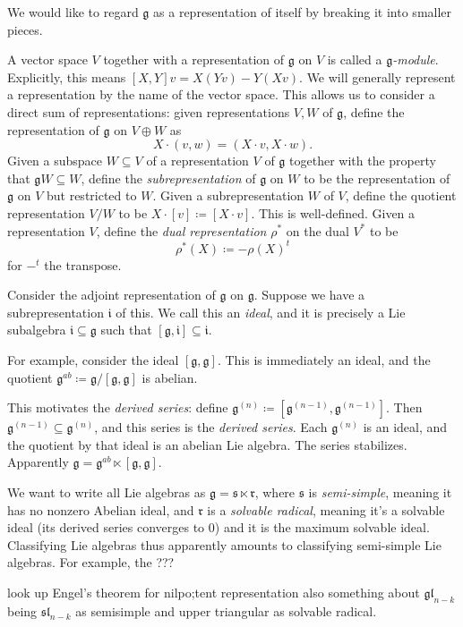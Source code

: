We would like to regard $\mathfrak{g} $ as a representation of itself by breaking it into smaller pieces.

A vector space $V$ together with a representation of $\mathfrak{g} $ on $V$ is called a \emph{$\mathfrak{g} $-module}. Explicitly, this means $[X,Y]v=X(Yv)-Y(Xv)$. We will generally represent a representation by the name of the vector space. This allows us to consider a direct sum of representations: given representations $V,W$ of $\mathfrak{g}$, define the representation of $\mathfrak{g} $ on $V\oplus W$ as
\[
	X\cdot (v,w) = (X\cdot v,X\cdot w)
.\]
Given a subspace $W\subseteq V$ of a representation $V$ of $\mathfrak{g} $ together with the property that $\mathfrak{g} W \subseteq W$, define the \emph{subrepresentation} of $\mathfrak{g} $ on $W$ to be the representation of $\mathfrak{g} $ on $V$ but restricted to $W$. Given a subrepresentation $W$ of $V$, define the quotient representation $V/W$ to be $X\cdot [v]\coloneqq [X\cdot v]$. This is well-defined. Given a representation $V$, define the \emph{dual representation} $\rho ^*$ on the dual $V^*$ to be
\[
	\rho^*(X) \coloneqq -\rho (X)^t
\]
for $-^t$ the transpose.

Consider the adjoint representation of $\mathfrak{g} $ on $\mathfrak{g} $. Suppose we have a subrepresentation $\mathfrak{i} $ of this. We call this an \emph{ideal}, and it is precisely a Lie subalgebra $\mathfrak{i} \subseteq \mathfrak{g} $ such that $[\mathfrak{g} ,\mathfrak{i} ]\subseteq \mathfrak{i} $.

For example, consider the ideal $[\mathfrak{g} ,\mathfrak{g} ]$. This is immediately an ideal, and the quotient $\mathfrak{g} ^{ab} \coloneqq \mathfrak{g} /[\mathfrak{g} ,\mathfrak{g} ]$ is abelian.

This motivates the \emph{derived series}: define $\mathfrak{g} ^{(n)} \coloneqq [\mathfrak{g} ^{(n-1)} ,\mathfrak{g} ^{(n-1)} ]$. Then $\mathfrak{g} ^{(n-1)} \subseteq \mathfrak{g} ^{(n)} $, and this series is the \emph{derived series}. Each $\mathfrak{g} ^{(n)} $ is an ideal, and the quotient by that ideal is an abelian Lie algebra. The series stabilizes. Apparently $\mathfrak{g} = \mathfrak{g} ^{ab} \ltimes [\mathfrak{g},\mathfrak{g} ]$.

We want to write all Lie algebras as $\mathfrak{g} = \mathfrak{s} \ltimes \mathfrak{r} $, where $\mathfrak{s} $ is \emph{semi-simple}, meaning it has no nonzero Abelian ideal, and $\mathfrak{r} $ is a \emph{solvable radical}, meaning it's a solvable ideal (its derived series converges to 0) and it is the maximum solvable ideal. Classifying Lie algebras thus apparently amounts to classifying semi-simple Lie algebras. For example, the ???

look up Engel's theorem for nilpo;tent representation also something about $\mathfrak{gl} _{n-k} $ being $\mathfrak{sl} _{n-k} $ as semisimple and upper triangular as solvable radical.
